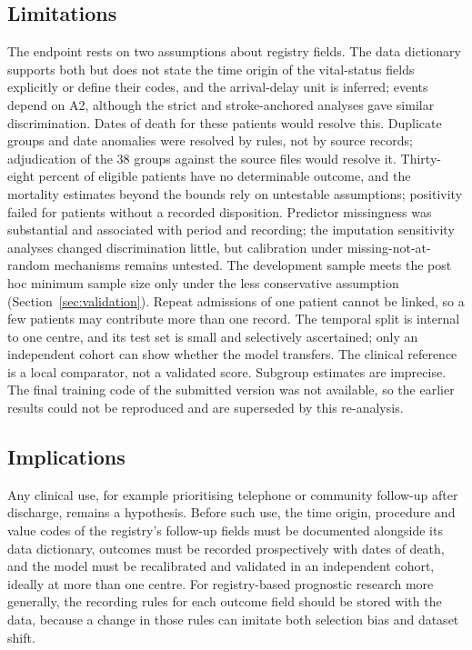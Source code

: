 \documentclass[preprint,10pt]{elsarticle}
\begin{document}
\subsection{Limitations}
\label{sec:limits}
The endpoint rests on two assumptions about registry fields. The data dictionary supports both but does not state the time origin of the vital-status fields explicitly or define their codes, and the arrival-delay unit is inferred; \NEtwo{} events depend on A2, although the strict and stroke-anchored analyses gave similar discrimination. Dates of death for these patients would resolve this. Duplicate groups and date anomalies were resolved by rules, not by source records; adjudication of the 38 groups against the source files would resolve it. Thirty-eight percent of eligible patients have no determinable outcome, and the mortality estimates beyond the bounds rely on untestable assumptions; positivity failed for patients without a recorded disposition. Predictor missingness was substantial and associated with period and recording; the imputation sensitivity analyses changed discrimination little, but calibration under missing-not-at-random mechanisms remains untested. The development sample meets the post hoc minimum sample size only under the less conservative assumption (Section~\ref{sec:validation}). Repeat admissions of one patient cannot be linked, so a few patients may contribute more than one record. The temporal split is internal to one centre, and its test set is small and selectively ascertained; only an independent cohort can show whether the model transfers. The clinical reference is a local comparator, not a validated score. Subgroup estimates are imprecise. The final training code of the submitted version was not available, so the earlier results could not be reproduced and are superseded by this re-analysis.

\subsection{Implications}
Any clinical use, for example prioritising telephone or community follow-up after discharge, remains a hypothesis. Before such use, the time origin, procedure and value codes of the registry's follow-up fields must be documented alongside its data dictionary, outcomes must be recorded prospectively with dates of death, and the model must be recalibrated and validated in an independent cohort, ideally at more than one centre. For registry-based prognostic research more generally, the recording rules for each outcome field should be stored with the data, because a change in those rules can imitate both selection bias and dataset shift.
\end{document}

